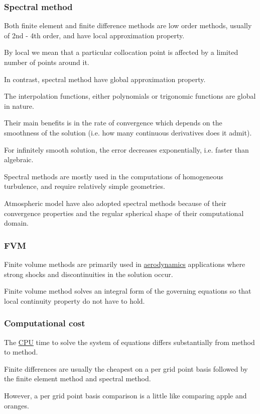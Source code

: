 \documentclass{article}
\begin{document}
\subsubsection{Spectral method}
Both finite element and finite difference methods are low order methods, usually of 2nd - 4th order, and have local approximation property.

By local we mean that a particular collocation point is affected by a limited number of points around it.

In contrast, spectral method have global approximation property.

The interpolation functions, either polynomials or trigonomic functions are global in nature.

Their main benefits is in the rate of convergence which depends on the smoothness of the solution (i.e. how many continuous derivatives does it admit).

For infinitely smooth solution, the error decreases exponentially, i.e. faster than algebraic.

Spectral methods are mostly used in the computations of homogeneous turbulence, and require relatively simple geometries.

Atmospheric model have also adopted spectral methods because of their convergence properties and the regular spherical shape of their computational domain.

\subsubsection{FVM}
Finite volume methods are primarily used in \href{https://en.wikipedia.org/wiki/Aerodynamics}{aerodynamics} applications where strong shocks and discontinuities in the solution occur.

Finite volume method solves an integral form of the governing equations so that local continuity property do not have to hold.

\subsubsection{Computational cost}
The \href{https://en.wikipedia.org/wiki/CPU}{CPU} time to solve the system of equations differs substantially from method to method.

Finite differences are usually the cheapest on a per grid point basis followed by the finite element method and spectral method.

However, a per grid point basis comparison is a little like comparing apple and oranges.
\end{document}
